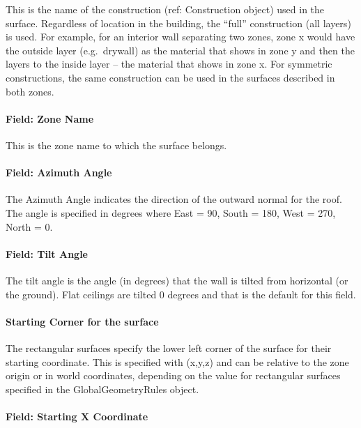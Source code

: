 This is the name of the construction (ref: Construction object) used in the surface. Regardless of location in the building, the ``full'' construction (all layers) is used. For example, for an interior wall separating two zones, zone x would have the outside layer (e.g.~drywall) as the material that shows in zone y and then the layers to the inside layer -- the material that shows in zone x. For symmetric constructions, the same construction can be used in the surfaces described in both zones.

\paragraph{Field: Zone Name}\label{field-zone-name-5-005}

This is the zone name to which the surface belongs.

\paragraph{Field: Azimuth Angle}\label{field-azimuth-angle-5}

The Azimuth Angle indicates the direction of the outward normal for the roof. The angle is specified in degrees where East = 90, South = 180, West = 270, North = 0.

\paragraph{Field: Tilt Angle}\label{field-tilt-angle-5}

The tilt angle is the angle (in degrees) that the wall is tilted from horizontal (or the ground). Flat ceilings are tilted 0 degrees and that is the default for this field.

\paragraph{Starting Corner for the surface}\label{starting-corner-for-the-surface-5}

The rectangular surfaces specify the lower left corner of the surface for their starting coordinate. This is specified with (x,y,z) and can be relative to the zone origin or in world coordinates, depending on the value for rectangular surfaces specified in the GlobalGeometryRules object.

\paragraph{Field: Starting X Coordinate}\label{field-starting-x-coordinate-5}

